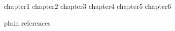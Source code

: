 \documentclass [MS] {uclathes}
\begin{document}
\makeintropages

  
 {chapter1}                       
 {chapter2}                      
 {chapter3}                       
 {chapter4}
 {chapter5}
 {chapter6}

 {plain}
 {references}
\end{document}
